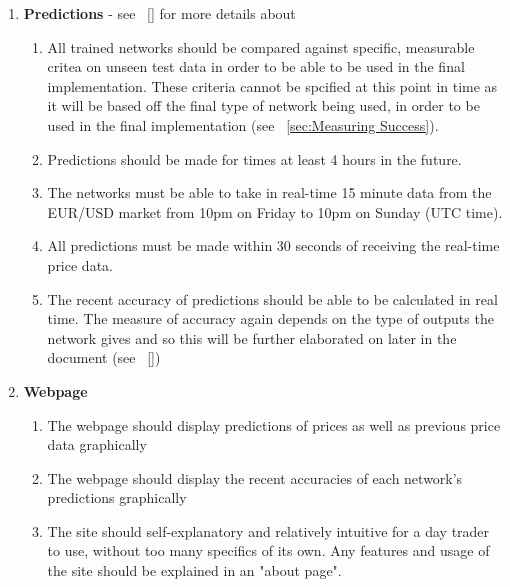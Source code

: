     \begin{enumerate}
        \item \textbf{Predictions} - see ~\ref{} for more details about 
        
        \begin{enumerate}
            \item All trained networks should be compared against specific, measurable critea on unseen test data in order to be able to be used in the final implementation. These criteria cannot be spcified at this point in time as it will be based off the final type of network being used, in order to be used in the final implementation (see ~\ref{sec:Measuring Success}).
            
            \item Predictions should be made for times at least 4 hours in the future.
            
            \item The networks must be able to take in real-time 15 minute data from the EUR/USD market from 10pm on Friday to 10pm on Sunday (UTC time).
            
            \item All predictions must be made within 30 seconds of receiving the real-time price data. 
            
            \item The recent accuracy of predictions should be able to be calculated in real time. The measure of accuracy again depends on the type of outputs the network gives and so this will be further elaborated on later in the document (see ~\ref{})
        
        \end{enumerate}

        \item \textbf{Webpage}
        
        \begin{enumerate}
            \item The webpage should display predictions of prices as well as previous price data graphically
            
            \item The webpage should display the recent accuracies of each network's predictions graphically
            
            \item The site should self-explanatory and relatively intuitive for a day trader to use, without too many specifics of its own. Any features and usage of the site should be explained in an "about page".
        \end{enumerate}


\end{enumerate}
